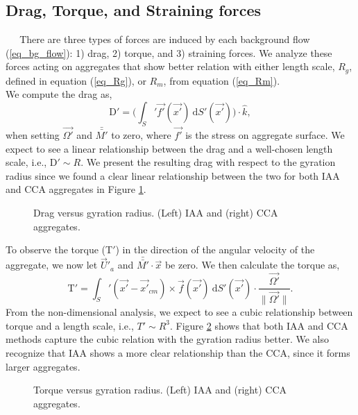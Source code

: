 \subsection{Drag, Torque, and Straining forces}
$\ \ \ \ \ $  
There are three types of forces are induced by each background flow (\ref{eq_bg_flow}):
 1) drag, 2) torque, and 3) straining forces. We analyze these forces acting on aggregates that show better relation with either length scale, $R_g$, defined in equation (\ref{eq_Rg}), or $R_m$, from equation (\ref{eq_Rm}). 
\\
We compute the drag as,
\begin{equation}
\text{D}' =  \Biggl( \int_S' \vec{f'} (\vec{x'}) \ \text{d} S'(\vec{x'}) \Biggr) \cdot \hat{k},
\end{equation}
when setting $\vec{\Omega'}$ and $\bar{\bar{M'}}$ to zero, 
where $\vec{f'}$ is the stress on aggregate surface. 
We expect to see a linear relationship between the drag and a well-chosen length scale, i.e., D$' \sim R$. 
 We present the resulting drag with respect to the gyration radius since we found a clear linear relationship between the two for both IAA and CCA aggregates in Figure \ref{fig_drag}. 
 \begin{figure}[h]
 \begin{center}
 \end{center}
 \caption{Drag versus gyration radius. (Left) IAA and (right) CCA aggregates.}
 \label{fig_drag}
 \end{figure}
\par
To observe the torque (T$'$) in the direction of the angular velocity of the aggregate, we now let $\vec{U}'_a$ and $\bar{\bar{M'}}\cdot \vec{x}$ be zero. 
We then calculate the torque as,
\begin{equation}
\text{T}' = 
\int_S' \left( \vec{x'} - \vec{x'}_{cm}  \right) \times \vec{f}(\vec{x'}) \ \text{d}S' (\vec{x'})
 \cdot \frac{\vec{\Omega'}}{\|\vec{\Omega'}\|}.
 \end{equation}
\newline
From the non-dimensional analysis, we expect to see a cubic relationship between torque and a length scale, i.e., $T' \sim R^3$. Figure \ref{fig_torque} shows that both IAA and CCA methods capture the cubic relation with the gyration radius better. We also recognize that IAA shows a more clear relationship than the CCA, since it forms larger aggregates. 
 \begin{figure}[h]
 \begin{center}
 \end{center}
 \caption{Torque versus gyration radius. (Left) IAA and (right) CCA aggregates.}
 \label{fig_torque}
 \end{figure}
